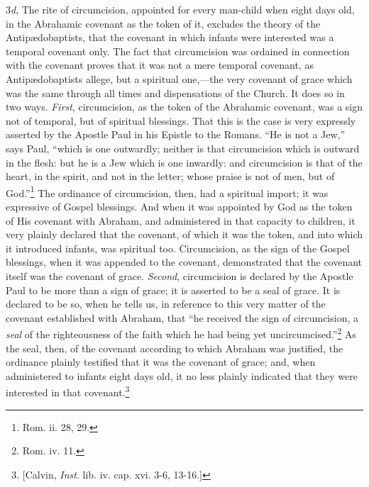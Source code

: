 \documentclass[english,]{book}
\begin{document}
3\emph{d}, The rite of circumcision, appointed for every man-child when eight days old, in the Abrahamic covenant as the token of it, excludes the theory of the Antipædobaptists, that the covenant in which infants were interested was a temporal covenant only. The fact that circumcision was ordained in connection with the covenant proves that it was not a mere temporal covenant, as Antipædobaptists allege, but a spiritual one,---the very covenant of grace which was the same through all times and dispensations of the Church. It does so in two ways. \emph{First}, circumcision, as the token of the Abrahamic covenant, was a sign not of temporal, but of spiritual blessings. That this is the case is very expressly asserted by the Apostle Paul in his Epistle to the Romans. ``He is not a Jew,'' says Paul, ``which is one outwardly; neither is that circumcision which is outward in the flesh: but he is a Jew which is one inwardly: and circumcision is that of the heart, in the spirit, and not in the letter; whose praise is not of men, but of God.''\footnote{Rom. ii. 28, 29.} The ordinance of circumcision, then, had a spiritual import; it was expressive of Gospel blessings. And when it was appointed by God as the token of His covenant with Abraham, and administered in that capacity to children, it very plainly declared that the covenant, of which it was the token, and into which it introduced infants, was spiritual too. Circumcision, as the sign of the Gospel blessings, when it was appended to the covenant, demonstrated that the covenant itself was the covenant of grace. \emph{Second}, circumcision is declared by the Apostle Paul to be more than a sign of grace; it is asserted to be a seal of grace. It is declared to be so, when he tells us, in reference to this very matter of the covenant established with Abraham, that ``he received the sign of circumcision, a \emph{seal} of the righteousness of the faith which he had being yet uncircumcised.''\footnote{Rom. iv. 11.} As the seal, then, of the covenant according to which Abraham was justified, the ordinance plainly testified that it was the covenant of grace; and, when administered to infants eight days old, it no less plainly indicated that they were interested in that covenant.\footnote{{[}Calvin, \emph{Inst}. lib. iv. cap. xvi. 3-6, 13-16.{]}}
\end{document}
